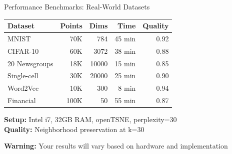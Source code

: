 \documentclass[aspectratio=169]{beamer}
\newcommand{\warning}[1]{\colorbox{red!10}{\textcolor{warningcolor}{\textbf{Warning:} #1}}}
\begin{document}
\begin{frame}{Performance Benchmarks: Real-World Datasets}
\begin{center}
\begin{tabular}{l|r|r|r|r}
\textbf{Dataset} & \textbf{Points} & \textbf{Dims} & \textbf{Time} & \textbf{Quality}\\
\hline
MNIST & 70K & 784 & 45 min & 0.92\\
CIFAR-10 & 60K & 3072 & 38 min & 0.88\\
20 Newsgroups & 18K & 10000 & 15 min & 0.85\\
Single-cell & 30K & 20000 & 25 min & 0.90\\
Word2Vec & 10K & 300 & 8 min & 0.94\\
Financial & 100K & 50 & 55 min & 0.87
\end{tabular}
\end{center}

\textbf{Setup:} Intel i7, 32GB RAM, openTSNE, perplexity=30\\
\textbf{Quality:} Neighborhood preservation at k=30

\vspace{0.3cm}
\warning{Your results will vary based on hardware and implementation}
\end{frame}
\end{document}
